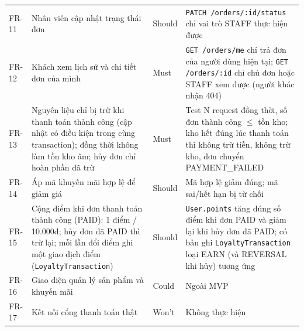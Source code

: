 \documentclass[a4paper]{article}
\begin{document}
{\begin{longtable}{@{}p{1.09cm}p{4.89cm}p{1.09cm}p{5.98cm}@{}}
FR-11 & Nhân viên cập nhật trạng thái đơn & Should & \texttt{PATCH /\allowbreak{}orders/\allowbreak{}:id/\allowbreak{}status} chỉ vai trò STAFF thực hiện được \\
FR-12 & Khách xem lịch sử và chi tiết đơn của mình & Must & \texttt{GET /\allowbreak{}orders/\allowbreak{}me} chỉ trả đơn của người dùng hiện tại; \texttt{GET /\allowbreak{}orders/\allowbreak{}:id} chỉ chủ đơn hoặc STAFF xem được (người khác nhận 404) \\
FR-13 & Nguyên liệu chỉ bị trừ khi thanh toán thành công (cập nhật có điều kiện trong cùng transaction); đồng thời không làm tồn kho âm; hủy đơn chỉ hoàn phần đã trừ & Must & Test N request đồng thời, số đơn thành công $\leq$ tồn kho; kho hết đúng lúc thanh toán thì không trừ tiền, không trừ kho, đơn chuyển PAYMENT\_FAILED \\
FR-14 & Áp mã khuyến mãi hợp lệ để giảm giá & Should & Mã hợp lệ giảm đúng; mã sai/hết hạn bị từ chối \\
FR-15 & Cộng điểm khi đơn thanh toán thành công (PAID): 1 điểm / 10.000đ; hủy đơn đã PAID thì trừ lại; mỗi lần đổi điểm ghi một giao dịch điểm (\texttt{LoyaltyTransaction}) & Should & \texttt{User.points} tăng đúng số điểm khi đơn PAID và giảm lại khi hủy đơn đã PAID; có bản ghi \texttt{LoyaltyTransaction} loại EARN (và REVERSAL khi hủy) tương ứng \\
FR-16 & Giao diện quản lý sản phẩm và khuyến mãi & Could & Ngoài MVP \\
FR-17 & Kết nối cổng thanh toán thật & Won't & Không thực hiện \\
\end{longtable}}
\end{document}
